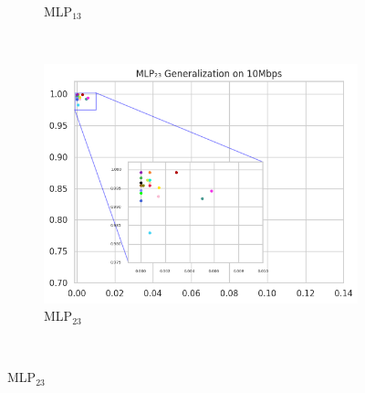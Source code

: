 \documentclass[a4paper,fleqn]{cas-sc}
\begin{document}
\begin{figure}[h!]
\begin{minipage}[t]{0.46\textwidth}
\begin{subfigure}[t]{0.33\textwidth}
				\caption{MLP$_{13}$}
				\label{fig:Generalizacao-MLP13-10Mbps}
			\end{subfigure}%
			~
			\begin{subfigure}[t]{0.33\textwidth}
				\includegraphics[draft=false, width=\textwidth]{./figs/Generalizacao-MLP23-10Mbps.png} 
				\caption{MLP$_{23}$}
				\label{fig:Generalizacao-MLP23-10Mbps}
			\end{subfigure}%
			~
			

\end{minipage}
\end{figure}
\end{document}

